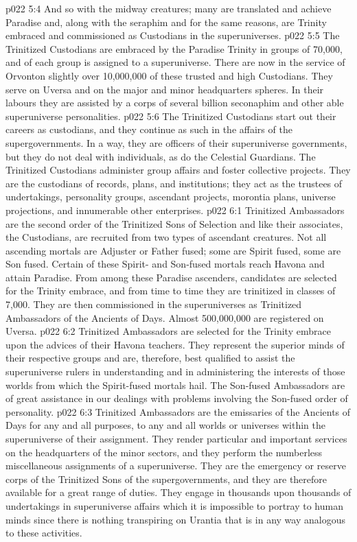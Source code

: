 \vs p022 5:4 And so with the midway creatures; many are translated and achieve Paradise and, along with the seraphim and for the same reasons, are Trinity embraced and commissioned as Custodians in the superuniverses.
\vs p022 5:5 The Trinitized Custodians are embraced by the Paradise Trinity in groups of 70,000, and  of each group is assigned to a superuniverse. There are now in the service of Orvonton slightly over 10,000,000 of these trusted and high Custodians. They serve on Uversa and on the major and minor headquarters spheres. In their labours they are assisted by a corps of several billion seconaphim and other able superuniverse personalities.
\vs p022 5:6 The Trinitized Custodians start out their careers as custodians, and they continue as such in the affairs of the supergovernments. In a way, they are officers of their superuniverse governments, but they do not deal with individuals, as do the Celestial Guardians. The Trinitized Custodians administer group affairs and foster collective projects. They are the custodians of records, plans, and institutions; they act as the trustees of undertakings, personality groups, ascendant projects, morontia plans, universe projections, and innumerable other enterprises.
\vs p022 6:1 Trinitized Ambassadors are the second order of the Trinitized Sons of Selection and like their associates, the Custodians, are recruited from two types of ascendant creatures. Not all ascending mortals are Adjuster or Father fused; some are Spirit fused, some are Son fused. Certain of these Spirit\hyp{} and Son\hyp{}fused mortals reach Havona and attain Paradise. From among these Paradise ascenders, candidates are selected for the Trinity embrace, and from time to time they are trinitized in classes of 7,000. They are then commissioned in the superuniverses as Trinitized Ambassadors of the Ancients of Days. Almost 500,000,000 are registered on Uversa.
\vs p022 6:2 Trinitized Ambassadors are selected for the Trinity embrace upon the advices of their Havona teachers. They represent the superior minds of their respective groups and are, therefore, best qualified to assist the superuniverse rulers in understanding and in administering the interests of those worlds from which the Spirit\hyp{}fused mortals hail. The Son\hyp{}fused Ambassadors are of great assistance in our dealings with problems involving the Son\hyp{}fused order of personality.
\vs p022 6:3 Trinitized Ambassadors are the emissaries of the Ancients of Days for any and all purposes, to any and all worlds or universes within the superuniverse of their assignment. They render particular and important services on the headquarters of the minor sectors, and they perform the numberless miscellaneous assignments of a superuniverse. They are the emergency or reserve corps of the Trinitized Sons of the supergovernments, and they are therefore available for a great range of duties. They engage in thousands upon thousands of undertakings in superuniverse affairs which it is impossible to portray to human minds since there is nothing transpiring on Urantia that is in any way analogous to these activities.
